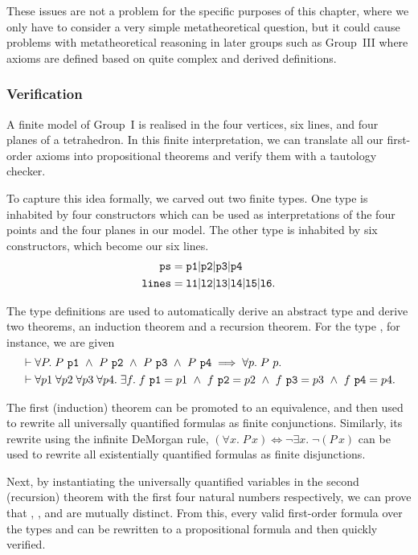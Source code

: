 These issues are not a problem for the specific purposes of this chapter, where we only have to consider a very simple metatheoretical question, but it could cause problems with metatheoretical reasoning in later groups such as Group~III where axioms are defined based on quite complex and derived definitions.

\subsubsection{Verification}
A finite model of Group~I is realised in the four vertices, six lines, and four planes of a tetrahedron. In this finite interpretation, we can translate all our first-order axioms into propositional theorems and verify them with a tautology checker.

To capture this idea formally, we carved out two finite types. One type is inhabited by four constructors which can be used as interpretations of the four points and the four planes in our model. The other type is inhabited by six constructors, which become our six lines.
\begin{align*}
\texttt{ps}   &= \texttt{p1} \vert \texttt{p2} \vert\texttt{p3} \vert\texttt{p4}\\
\texttt{lines}&= \texttt{l1} \vert \texttt{l2} \vert\texttt{l3} \vert\texttt{l4} \vert\texttt{l5} \vert\texttt{l6}.
\end{align*}

The type definitions are used to automatically derive an abstract type and derive two theorems, an induction theorem and a recursion theorem. For the type , for instance, we are given
\begin{align*}
&\vdash\forall P.\; P\ \code{p1}\ \wedge\ P\ \code{p2}\ \wedge\ P\ \code{p3}\ \wedge\ P\ \code{p4}\implies\forall p.\; P\ p.\\
&\vdash\forall p1\;\forall p2\;\forall p3\;\forall p4.\; \exists f.\; f\ \code{p1} = p1\ \wedge\ f\ \code{p2} = p2\ \wedge\ f\ \code{p3} = p3\ \wedge\ f\ \code{p4} = p4.
\end{align*}

The first (induction) theorem can be promoted to an equivalence, and then used to rewrite all universally quantified formulas as finite conjunctions. Similarly, its rewrite using the infinite DeMorgan rule, $(\forall x.\; P\,x) \iff \neg\exists x.\; \neg (P\,x)$ can be used to rewrite all existentially quantified formulas as finite disjunctions.

Next, by instantiating the universally quantified variables in the second (recursion) theorem with the first four natural numbers respectively, we can prove that , ,  and  are mutually distinct. From this, every valid first-order formula over the types  and  can be rewritten to a propositional formula and then quickly verified.

